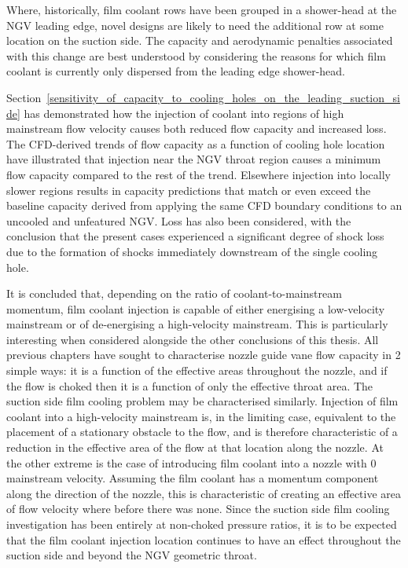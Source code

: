 \documentclass[a4paper, 11pt, oneside]{report}
\begin{document}
Where, historically, film coolant rows have been grouped in a shower-head at the NGV leading edge, novel designs are likely to need the additional row at some location on the suction side. The capacity and aerodynamic penalties associated with this change are best understood by considering the reasons for which film coolant is currently only dispersed from the leading edge shower-head.

Section~\ref{sensitivity_of_capacity_to_cooling_holes_on_the_leading_suction_side} has demonstrated how the injection of coolant into regions of high mainstream flow velocity causes both reduced flow capacity and increased loss. The CFD-derived trends of flow capacity as a function of cooling hole location have illustrated that injection near the NGV throat region causes a minimum flow capacity compared to the rest of the trend. Elsewhere injection into locally slower regions results in capacity predictions that match or even exceed the baseline capacity derived from applying the same CFD boundary conditions to an uncooled and unfeatured NGV. Loss has also been considered, with the conclusion that the present cases experienced a significant degree of shock loss due to the formation of shocks immediately downstream of the single cooling hole. 

It is concluded that, depending on the ratio of coolant-to-mainstream momentum, film coolant injection is capable of either energising a low-velocity mainstream or of de-energising a high-velocity mainstream. This is particularly interesting when considered alongside the other conclusions of this thesis. All previous chapters have sought to characterise nozzle guide vane flow capacity in 2 simple ways: it is a function of the effective areas throughout the nozzle, and if the flow is choked then it is a function of only the effective throat area. The suction side film cooling problem may be characterised similarly. Injection of film coolant into a high-velocity mainstream is, in the limiting case, equivalent to the placement of a stationary obstacle to the flow, and is therefore characteristic of a reduction in the effective area of the flow at that location along the nozzle. At the other extreme is the case of introducing film coolant into a nozzle with $0$ mainstream velocity. Assuming the film coolant has a momentum component along the direction of the nozzle, this is characteristic of creating an effective area of flow velocity where before there was none. Since the suction side film cooling investigation has been entirely at non-choked pressure ratios, it is to be expected that the film coolant injection location continues to have an effect throughout the suction side and beyond the NGV geometric throat.
\end{document}
